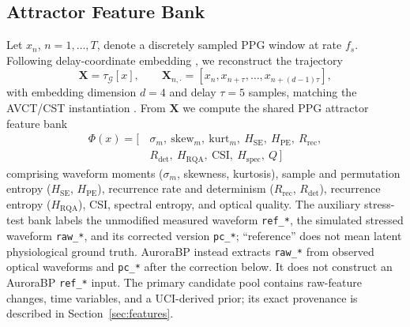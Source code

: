 \documentclass[journal]{IEEEtran}
\begin{document}
\subsection{Attractor Feature Bank}
Let $x_n$, $n = 1,\dots,T$, denote a discretely sampled PPG window at rate $f_s$. Following delay-coordinate embedding \cite{takens1981}, we reconstruct the trajectory
\begin{equation}
\mathbf{X} = \tau_{\mathcal{G}}[x], \qquad \mathbf{X}_{n,\cdot} = [x_n, x_{n+\tau}, \dots, x_{n+(d-1)\tau}],
\label{eq:embed}
\end{equation}
with embedding dimension $d = 4$ and delay $\tau = 5$ samples, matching the AVCT/CST instantiation \cite{avct2026,cst2026}. From $\mathbf{X}$ we compute the shared PPG attractor feature bank
\begin{equation}
\begin{aligned}
\Phi(x) = [\,&\sigma_m,\ \mathrm{skew}_m,\ \mathrm{kurt}_m,\ H_{\mathrm{SE}},\ H_{\mathrm{PE}},\ R_{\mathrm{rec}},\\
&R_{\mathrm{det}},\ H_{\mathrm{RQA}},\ \mathrm{CSI},\ H_{\mathrm{spec}},\ Q\,]
\end{aligned}
\label{eq:featurebank}
\end{equation}
comprising waveform moments ($\sigma_m$, skewness, kurtosis), sample and permutation entropy ($H_{\mathrm{SE}}$, $H_{\mathrm{PE}}$), recurrence rate and determinism ($R_{\mathrm{rec}}$, $R_{\mathrm{det}}$), recurrence entropy ($H_{\mathrm{RQA}}$), CSI, spectral entropy, and optical quality. The auxiliary stress-test bank labels the unmodified measured waveform \texttt{ref\_*}, the simulated stressed waveform \texttt{raw\_*}, and its corrected version \texttt{pc\_*}; ``reference'' does not mean latent physiological ground truth. AuroraBP instead extracts \texttt{raw\_*} from observed optical waveforms and \texttt{pc\_*} after the correction below. It does not construct an AuroraBP \texttt{ref\_*} input. The primary candidate pool contains raw-feature changes, time variables, and a UCI-derived prior; its exact provenance is described in Section~\ref{sec:features}.
\end{document}
